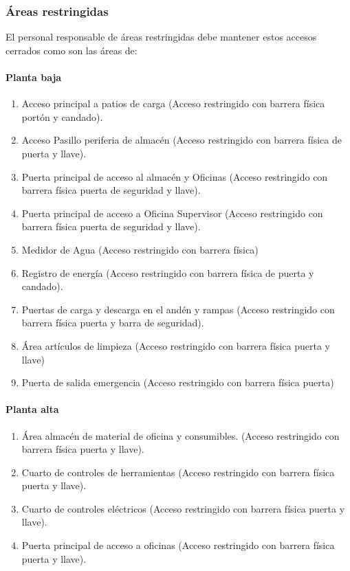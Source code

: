 \subsubsection{Áreas restringidas}
El personal responsable de áreas restringidas debe mantener estos accesos cerrados como son las áreas de:

\paragraph{Planta baja}
\begin{enumerate}
	\item Acceso principal a patios de carga (Acceso restringido con barrera física portón y candado).
	\item Acceso Pasillo periferia de almacén (Acceso restringido con barrera física de puerta y llave).
	\item Puerta principal de acceso al almacén y Oficinas (Acceso restringido con barrera física puerta de seguridad y llave).
	\item Puerta principal de acceso a Oficina Supervisor (Acceso restringido con barrera física puerta de seguridad y llave).
	\item Medidor de Agua (Acceso restringido con barrera física)
	\item Registro de energía (Acceso restringido con barrera física de puerta y candado).
	\item Puertas de carga y descarga en el andén y rampas (Acceso restringido con barrera física puerta y barra de seguridad).
	\item Área artículos de limpieza (Acceso restringido con barrera física puerta y llave)
	\item Puerta de salida emergencia (Acceso restringido con barrera física puerta)
\end{enumerate}

\paragraph{Planta alta}

\begin{enumerate}
	\item Área almacén de material de oficina y consumibles. (Acceso restringido con barrera física puerta y llave).
	\item Cuarto de controles de herramientas (Acceso restringido con barrera física puerta y llave).
	\item Cuarto de controles eléctricos (Acceso restringido con barrera física puerta y llave).
	\item Puerta principal de acceso a oficinas (Acceso restringido con barrera física puerta y llave).
\end{enumerate}

